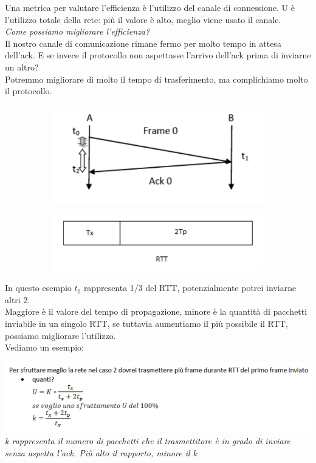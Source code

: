 \documentclass[11pt, oneside]{article}   	%
\begin{document}
Una metrica per valutare l'efficienza è l'utilizzo del canale di connessione. U è l’utilizzo totale della rete: più il valore è alto, meglio viene usato il canale.\\
\emph{Come possiamo migliorare l'efficienza? }\\
Il nostro canale di comunicazione rimane fermo per molto tempo in attesa dell'ack. E se invece il protocollo non aspettasse l'arrivo dell'ack prima di inviarne un altro?\\
Potremmo migliorare di molto il tempo di trasferimento, ma complichiamo molto il protocollo.
\begin{figure}[H]
\begin{subfigure}[h]{0.5\linewidth}
\includegraphics[width=\linewidth]{dll3}
\end{subfigure}
\hfill
\begin{subfigure}[h]{0.4\linewidth}
\includegraphics[width=\linewidth]{dll4}
\end{subfigure}%
\end{figure}
In questo esempio \(t_0\) rappresenta 1/3 del RTT, potenzialmente potrei inviarne altri 2.\\
Maggiore è il valore del tempo di propagazione, minore è la quantità di pacchetti inviabile in un singolo RTT, se tuttavia aumentiamo il più possibile il RTT, possiamo migliorare l'utilizzo.\\
Vediamo un esempio:
\begin{center}
\includegraphics[scale=0.8]{ex3}\\
\emph{k rappresenta il numero di pacchetti che il trasmettitore è in grado di inviare senza aspetta l'ack. Più alto il rapporto, minore il k}
\end{center}
\end{document}
